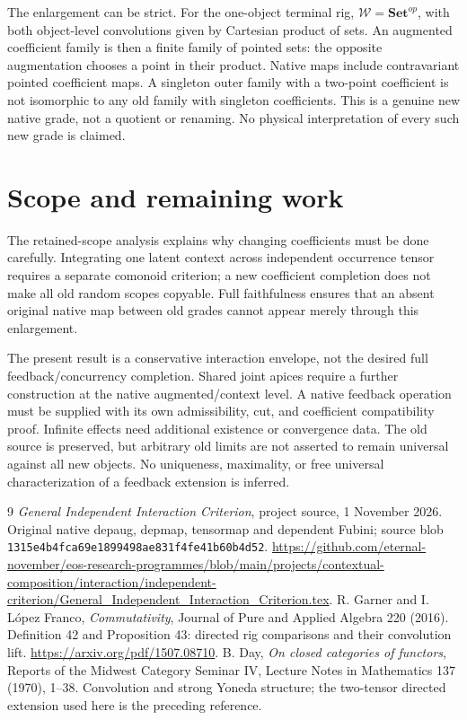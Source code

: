 \documentclass[11pt]{article}
\newcommand{\W}{\mathcal W}
\begin{document}
The enlargement can be strict. For the one-object terminal rig, $\W=\mathbf{Set}^{op}$, with both object-level convolutions given by Cartesian product of sets. An augmented coefficient family is then a finite family of pointed sets: the opposite augmentation chooses a point in their product. Native maps include contravariant pointed coefficient maps. A singleton outer family with a two-point coefficient is not isomorphic to any old family with singleton coefficients. This is a genuine new native grade, not a quotient or renaming. No physical interpretation of every such new grade is claimed.

\section{Scope and remaining work}
The retained-scope analysis explains why changing coefficients must be done carefully. Integrating one latent context across independent occurrence tensor requires a separate comonoid criterion; a new coefficient completion does not make all old random scopes copyable. Full faithfulness ensures that an absent original native map between old grades cannot appear merely through this enlargement.

The present result is a conservative interaction envelope, not the desired full feedback/concurrency completion. Shared joint apices require a further construction at the native augmented/context level. A native feedback operation must be supplied with its own admissibility, cut, and coefficient compatibility proof. Infinite effects need additional existence or convergence data. The old source is preserved, but arbitrary old limits are not asserted to remain universal against all new objects. No uniqueness, maximality, or free universal characterization of a feedback extension is inferred.

\begin{thebibliography}{9}
 \emph{General Independent Interaction Criterion}, project source, 1 November 2026. Original native depaug, depmap, tensormap and dependent Fubini; source blob \texttt{1315e4b4fca69e1899498ae831f4fe41b60b4d52}.
\url{https://github.com/eternal-november/eos-research-programmes/blob/main/projects/contextual-composition/interaction/independent-criterion/General_Independent_Interaction_Criterion.tex}.
 R. Garner and I. L\'opez Franco, \emph{Commutativity}, Journal of Pure and Applied Algebra 220 (2016). Definition 42 and Proposition 43: directed rig comparisons and their convolution lift. \url{https://arxiv.org/pdf/1507.08710}.
 B. Day, \emph{On closed categories of functors}, Reports of the Midwest Category Seminar IV, Lecture Notes in Mathematics 137 (1970), 1--38. Convolution and strong Yoneda structure; the two-tensor directed extension used here is the preceding reference.
\end{thebibliography}
\end{document}
